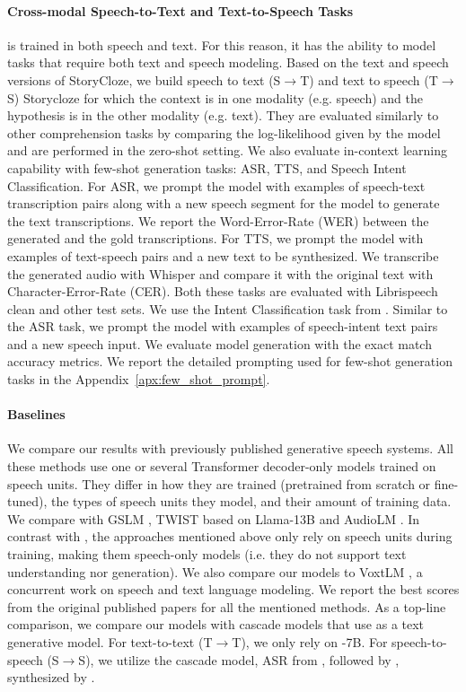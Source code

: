 \paragraph{Cross-modal Speech-to-Text and Text-to-Speech Tasks}
\spot is trained in both speech and text. For this reason, it has the ability to model tasks that require both text and speech modeling. Based on the text and speech versions of StoryCloze, we build speech to text (S$\rightarrow$T) and text to speech (T$\rightarrow$S) Storycloze for which the context is in one modality (e.g. speech) and the hypothesis is in the other modality (e.g. text).
They are evaluated similarly to other comprehension tasks by comparing the log-likelihood given by the model and are performed in the zero-shot setting.
We also evaluate \spot in-context learning capability with few-shot generation tasks: ASR, TTS, and Speech Intent Classification.
For ASR, 
we prompt the model with examples of speech-text transcription pairs along with a new speech segment for the model to generate the text transcriptions.
We report the Word-Error-Rate (WER) between the generated and the gold transcriptions.
For TTS, 
we prompt the model with examples of text-speech pairs and a new text to be synthesized.
We transcribe the generated audio with Whisper \citep{radford2023robust} and compare it with the original text with Character-Error-Rate (CER). Both these tasks are evaluated with Librispeech clean and other test sets.
We use the Intent Classification task from \citet{chang2023speechpromptv2}. Similar to the ASR task, we prompt the model with examples of speech-intent text pairs and a new speech input. We evaluate model generation with the exact match accuracy metrics.
We report the detailed prompting used for few-shot generation tasks in the Appendix~\ref{apx:few_shot_prompt}.

\paragraph{Baselines} We compare our results with previously published generative speech systems.
All these methods use one or several Transformer \citep{vaswani2017attention} decoder-only models trained on speech units. They differ in how they are trained (pretrained from scratch or fine-tuned), the types of speech units they model, and their amount of training data. We compare with 
GSLM \cite{gslm}, TWIST \citep{hassid2023textually} based on Llama-13B and AudioLM \citep{borsos2023audiolm}.
In contrast with \spot, the approaches mentioned above only rely on speech units during training, making them speech-only models (i.e. they  do not support text understanding nor generation). We also compare our models to VoxtLM \citep{maiti2023voxtlm}, a concurrent work on speech and text language modeling.
We report the best scores from the original published papers for all the mentioned methods. As a top-line comparison, we compare our models with cascade models that use \llamatwo as a text generative model. For text-to-text (T$\rightarrow$T), we only rely on \llamatwo -7B. For speech-to-speech (S$\rightarrow$S), we utilize the cascade model, ASR from \whispermedium\cite{radford2023robust}, followed by \llamatwo, synthesized by \mmstts\cite{pratap2023scaling}.

